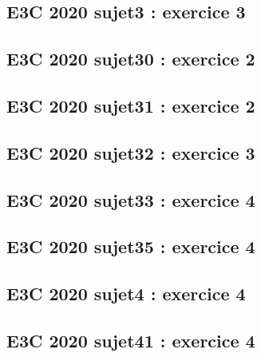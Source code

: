 \documentclass[lang=fr,edition=teacher,layout=sheet]{mxbook}
\begin{document}
\par\bigskip
{}\subsection*{E3C 2020 sujet3 : exercice 3}
\begingroup\endgroup
\par\bigskip
{}\subsection*{E3C 2020 sujet30 : exercice 2}
\begingroup\endgroup
\par\bigskip
{}\subsection*{E3C 2020 sujet31 : exercice 2}
\begingroup\endgroup
\par\bigskip
{}\subsection*{E3C 2020 sujet32 : exercice 3}
\begingroup\endgroup
\par\bigskip
{}\subsection*{E3C 2020 sujet33 : exercice 4}
\begingroup\endgroup
\par\bigskip
{}\subsection*{E3C 2020 sujet35 : exercice 4}
\begingroup\endgroup
\par\bigskip
{}\subsection*{E3C 2020 sujet4 : exercice 4}
\begingroup\endgroup
\par\bigskip
{}\subsection*{E3C 2020 sujet41 : exercice 4}
\end{document}

